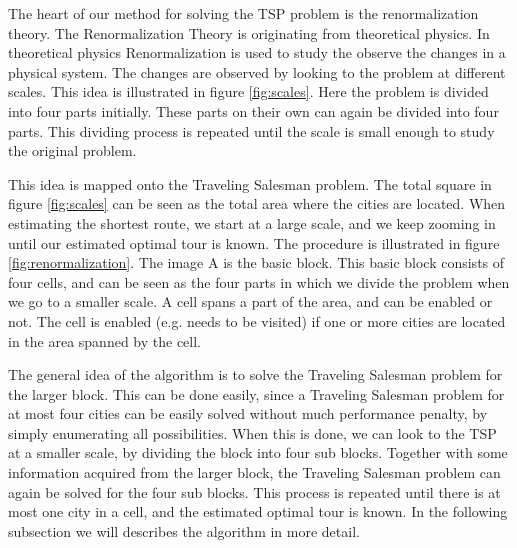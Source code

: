 The heart of our method for solving the TSP problem is the renormalization
theory. The Renormalization Theory is originating from theoretical physics. In
theoretical physics Renormalization is used to study the observe the changes
in a physical system. The changes are observed by looking to the problem at
different scales. This idea is illustrated in figure \ref{fig:scales}. Here
the problem is divided into four parts initially. These parts on their own can
again be divided into four parts. This dividing process is repeated until the
scale is small enough to study the original problem.

This idea is mapped onto the Traveling Salesman problem. The total square in
figure \ref{fig:scales} can be seen as the total area where the cities are
located. When estimating the shortest route, we start at a large scale, and we
keep zooming in until our estimated optimal tour is known. The procedure is
illustrated in figure \ref{fig:renormalization}. The image A is the basic
block. This basic block consists of four cells, and can be seen as the four
parts in which we divide the problem when we go to a smaller scale. A cell
spans a part of the area, and can be enabled or not. The cell is enabled (e.g.
needs to be visited) if one or more cities are located in the area spanned by
the cell.

The general idea of the algorithm is to solve the Traveling Salesman problem
for the larger block. This can be done easily, since a Traveling Salesman
problem for at most four cities can be easily solved without much performance
penalty, by simply enumerating all possibilities. When this is done, we can
look to the TSP at a smaller scale, by dividing the block into four sub blocks.
Together with some information acquired from the larger block, the Traveling
Salesman problem can again be solved for the four sub blocks. This process is
repeated until there is at most one city in a cell, and the estimated optimal
tour is known. In the following subsection we will describes the algorithm in
more detail.

